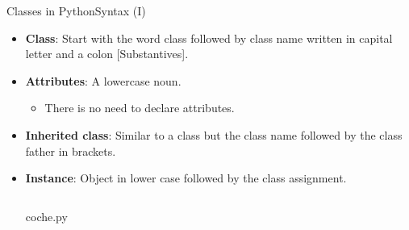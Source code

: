 \documentclass[10pt,compress]{beamer} %
\begin{document}


\begin{frame}{Classes in Python}{Syntax (I)}
\vspace{-0.2cm}
\begin{itemize}			
		\item \small{\textbf{Class}: Start with the word \alert{class} followed by class name written in \alert{capital letter} and a colon [Substantives].}
		\item \small{\textbf{Attributes}: A lowercase noun.}
		\begin{itemize}
		\item \footnotesize{There is no need to declare attributes.}
		\end{itemize}
		
		\item \small{\textbf{Inherited class}: Similar to a class but the class name followed by the class father in brackets.}
		\item \small{\textbf{Instance}: Object in lower case followed by the class assignment.}
			\vspace{-0.2cm} 
  	   \begin{columns}
			\begin{block}{\small{coche.py}}
			\vspace{-0.3cm} 
				\vspace{-0.2cm} 
			\end{block}
	\end{columns}		
\end{itemize}			
\end{frame}
\end{document}
